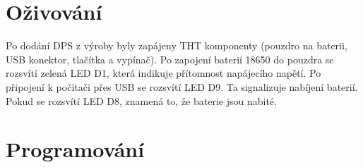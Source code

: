 \chapter{Oživování}
Po dodání DPS z výroby byly zapájeny THT komponenty (pouzdro na baterii, USB konektor, tlačítka a vypínač). Po zapojení baterií
18650 do pouzdra se rozsvítí zelená LED D1, která indikuje přítomnost napájecího napětí. Po připojení k počítači přes USB
se rozsvítí LED D9. Ta signalizuje nabíjení baterií. Pokud se rozsvítí LED D8, znamená to, že baterie jsou nabité.


\chapter{Programování}
